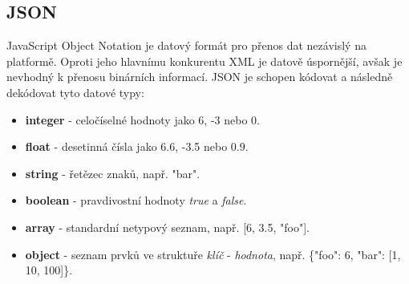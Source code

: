 \documentclass[16pt,titlepage,a4paper]{article}
\begin{document}
\subsection{JSON}

JavaScript Object Notation je datový formát pro přenos dat nezávislý na platformě. Oproti jeho hlavnímu konkurentu XML je datově úspornější, avšak je nevhodný k přenosu binárních informací. JSON je schopen kódovat a následně dekódovat tyto datové typy:

\begin{itemize}
    \item
    \textbf{integer} - celočíselné hodnoty jako 6, -3 nebo 0.

    \item
    \textbf{float} - desetinná čísla jako 6.6, -3.5 nebo 0.9.

    \item
    \textbf{string} - řetězec znaků, např. "bar".

    \item
    \textbf{boolean} - pravdivostní hodnoty \textit{true} a \textit{false}.

    \item
    \textbf{array} - standardní netypový seznam, např. [6, 3.5, "foo"].

    \item
    \textbf{object} - seznam prvků ve struktuře \textit{klíč} - \textit{hodnota}, např. \{"foo": 6, "bar": [1, 10, 100]\}.
\end{itemize}
\end{document}

